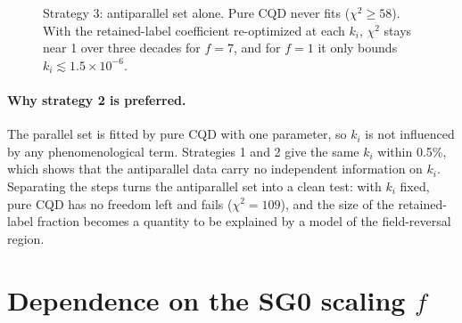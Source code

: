 \documentclass[11pt,a4paper]{article}
\newcommand{\pa}{{\uparrow\downarrow}}
\newcommand{\RLC}{\mathrm{RLC}}
\begin{document}
\begin{figure}[h]
\centering
{}
\caption{Strategy 3: antiparallel set alone. Pure CQD never fits ($\chi^2\ge58$). With the retained-label
coefficient re-optimized at each $k_i$, $\chi^2$ stays near 1 over three decades for $f=7$, and for
$f=1$ it only bounds $k_i\lesssim1.5\times10^{-6}$.}
\label{fig:strategies}
\end{figure}

\paragraph{Why strategy 2 is preferred.} The parallel set is fitted by pure CQD with one parameter, so
$k_i$ is not influenced by any phenomenological term. Strategies 1 and 2 give the same $k_i$ within
0.5\%, which shows that the antiparallel data carry no independent information on $k_i$. Separating
the steps turns the antiparallel set into a clean test: with $k_i$ fixed, pure CQD has no freedom left
and fails ($\chi^2=109$), and the size of the retained-label fraction becomes a quantity to be
explained by a model of the field-reversal region.

\section{Dependence on the SG0 scaling \texorpdfstring{$f$}{f}}
\label{sec:fscan}
\end{document}
